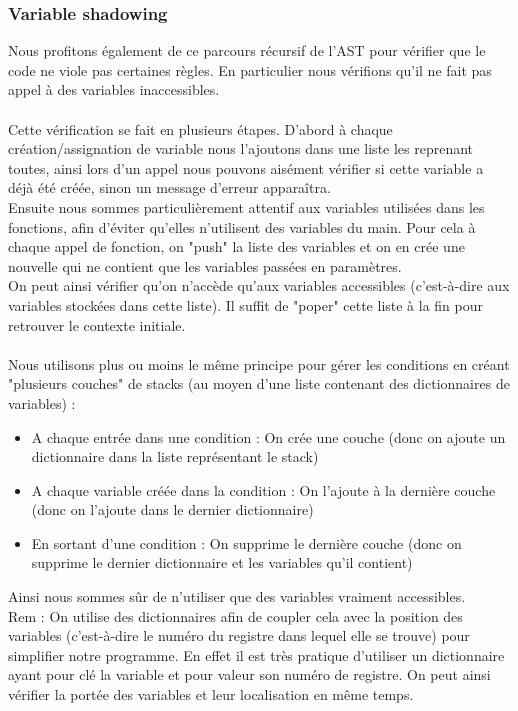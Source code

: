 \documentclass[a4paper,10pt]{article}
\begin{document}
	\subsubsection{Variable shadowing}
		Nous profitons également de ce parcours récursif de l'AST pour vérifier que le code ne viole pas certaines règles. En particulier nous vérifions qu'il ne fait pas appel à des variables inaccessibles.\\
		~\\
		Cette vérification se fait en plusieurs étapes. D'abord à chaque création/assignation de variable nous l'ajoutons dans une liste les reprenant toutes, ainsi lors d'un appel nous pouvons aisément vérifier si cette variable a déjà été créée, sinon un message d'erreur apparaîtra.\\
		Ensuite nous sommes particulièrement attentif aux variables utilisées dans les fonctions, afin d'éviter qu'elles n'utilisent des variables du main. Pour cela à chaque appel de fonction, on "push" la liste des variables et on en crée une nouvelle qui ne contient que les variables passées en paramètres.\\
		On peut ainsi vérifier qu'on n'accède qu'aux variables accessibles (c'est-à-dire aux variables stockées dans cette liste). Il suffit de "poper" cette liste à la fin pour retrouver le contexte initiale.\\
		~\\
		Nous utilisons plus ou moins le même principe pour gérer les conditions en créant "plusieurs couches" de stacks (au moyen d'une liste contenant des dictionnaires de variables) : \begin{itemize}
			\item A chaque entrée dans une condition : On crée une couche (donc on ajoute un dictionnaire dans la liste représentant le stack)
			\item A chaque variable créée dans la condition : On l'ajoute à la dernière couche (donc on l'ajoute dans le dernier dictionnaire)
			\item En sortant d'une condition : On supprime le dernière couche (donc on supprime le dernier dictionnaire et les variables qu'il contient)
		\end{itemize}
		Ainsi nous sommes sûr de n'utiliser que des variables vraiment accessibles.\\
		Rem : On utilise des dictionnaires afin de coupler cela avec la position des variables (c'est-à-dire le numéro du registre dans lequel elle se trouve) pour simplifier notre programme. En effet il est très pratique d'utiliser un dictionnaire ayant pour clé la variable et pour valeur son numéro de registre. On peut ainsi vérifier la portée des variables et leur localisation en même temps.\\
\end{document}
